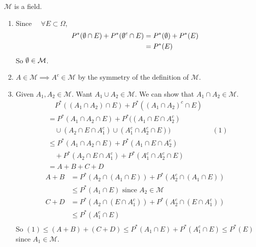 \documentclass[class=article,crop=false]{standalone}
\begin{document}
\section{}
\begin{lem}[1]
	$\mathcal{M}$ is a field.
\end{lem}
\begin{prf}
\begin{enumerate}[label=(\roman*)]
	\item Since $\quad \forall E \subset \Omega$, 
		 \begin{align*}
			 P^* (\emptyset \cap E) + P^* (\emptyset^{c} \cap E) &= P^* (\emptyset) + P^* (E) \\
							       &= P^* (E) 
		\end{align*}
		So $\emptyset \in \mathcal{M}$.
	\item $A \in \mathcal{M} \implies A^{c} \in \mathcal{M}$ by the symmetry of the definition of $\mathcal{M}$.
	\item Given $A_1,A_2 \in \mathcal{M}$. Want $A_1 \cup A_2 \in \mathcal{M}$. We can show that $A_1 \cap A_2 \in \mathcal{M}$.
		\begin{align*}
			& \quad  P^* ((A_1 \cap A_2) \cap E) + P^* ((A_1 \cap A_2)^{c} \cap E) \\
			&= P^* (A_1 \cap A_2 \cap E) + P^* ((A_1 \cap E  \cap A_2^{c}) \\ 
										      &\quad \cup (A_2 \cap E \cap A_1^{c}) \cup (A_1^{c} \cap A_2^{c} \cap E) ) \qquad \qquad \qquad   (1) \\
	&\leq P^* (A_1 \cap A_2 \cap E) + P^* (A_1 \cap E \cap A_2^{c})\\
	&\quad  + P^* (A_2 \cap E \cap A_1^{c}) + P^* (A_1^{c} \cap A_2^{c} \cap E) \\
	&= A+B+C+D 
		\end{align*}
		\begin{align*}
			A+B &= P^* (A_2 \cap (A_1 \cap E)) + P^* (A_2^{c} \cap (A_1 \cap E)) \\
			    & \leq P^* (A_1 \cap E) \text{ since }  A_2 \in \mathcal{M} \\
			C+D &= P^* (A_2 \cap (E \cap A_1^{c})) + P^* (A_2^{c} \cap (E \cap A_1^{c}))\\ 
			    &\leq P^* (A_1^{c} \cap E) \\
		\end{align*}
		So $(1)\leq (A+B)+(C+D) \leq P^* (A_1 \cap E) + P^* (A_1^{c} \cap E) \leq P^* (E)$ since $A_1 \in \mathcal{M}$.
\end{enumerate}
\end{prf}
\end{document}
